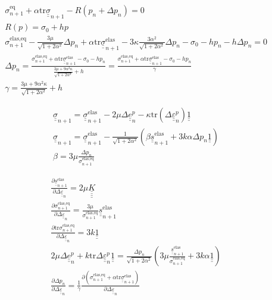 \documentclass[12pt]{article}
\newcommand\ul[1]{\underline{#1}}
\newcommand\uusigma{\ul{\ul{\sigma}}}
\newcommand\uus{\ul{\ul{s}}}
\newcommand\uue{\ul{\ul{e}}}
\newcommand\uuUnit{\ul{\ul{1}}}
\newcommand\uueps{\ul{\ul{\varepsilon}}}
\newcommand{\uuuuK}{\ul{\ul{\ul{\ul{K}}}}}
\newcommand\Deltaepsp{\Delta \uueps_{n}^p}
\newcommand\Deltaeps{\Delta \uueps_{n}}
\newcommand\Deltaep{\Delta \uue_{n}^p}
\newcommand\sigmaeqn{\sigma_{n+1}^\text{eq}}
\newcommand\sigmaeqnelas{\sigma_{n+1}^\text{elas,eq}}
\newcommand\uusn{\uus_{n+1}}
\newcommand\uusnelas{\uus_{n+1}^\text{elas}}
\newcommand\uusigman{\ul{\ul{\sigma}}_{n+1}}
\newcommand\uusigmanelas{\uusigman^{\text{elas}}}
\newcommand\mtr{\mathrm{tr}}
\begin{document}
\begin{align}
    & \sigmaeqn + \alpha \mtr \uusigman - R(p_n + \Delta p_n) = 0 \\
    & R(p) = \sigma_0 + h p \\
    & \sigmaeqnelas - \frac{3\mu}{\sqrt{1 + 2\alpha^2}}\Delta p_n + \alpha \mtr \uusigmanelas - 3\kappa \frac{3\alpha^2}{\sqrt{1 + 2\alpha^2}} \Delta p_n - \sigma_0 - h p_n - h \Delta p_n = 0 \\
    & \Delta p_n = \frac{ \sigmaeqnelas + \alpha \mtr \uusigmanelas - \sigma_0 - h p_n}{ \frac{3\mu + 9\alpha^2\kappa}{\sqrt{1 + 2\alpha^2}} + h} = \frac{ \sigmaeqnelas + \alpha \mtr \uusigmanelas - \sigma_0 - h p_n}{ \gamma } \\
    & \gamma = \frac{3\mu + 9\alpha^2\kappa}{\sqrt{1 + 2\alpha^2}} + h
\end{align}

\begin{align}
    & \uusigma_{n+1} = \uusigma_{n+1}^\text{elas} - 2\mu \Deltaep - \kappa \mtr (\Deltaepsp) \uuUnit \\
    & \uusigma_{n+1} = \uusigma_{n+1}^\text{elas} - \frac{1}{\sqrt{1 + 2\alpha^2}}\left( \beta \uusnelas + 3k\alpha \Delta p_n \uuUnit \right) \\
    & \beta = 3\mu\frac{\Delta p_n}{\sigmaeqnelas} 
\end{align}

\begin{align}
    & \frac{\partial \uusnelas{}}{\partial \Deltaeps} = 2\mu \uuuuK\\
    & \frac{\partial \sigmaeqnelas{}}{\partial \Deltaeps} = \frac{3\mu}{\sigmaeqnelas}\uusnelas \\
    & \frac{\partial\mtr\sigmaeqnelas}{\partial\Deltaeps} = 3k\uuUnit \\
    & 2\mu\Deltaep + k\mtr\Deltaepsp\uuUnit = \frac{\Delta p_n}{\sqrt{1 + 2\alpha^2}} \left( 3\mu \frac{\uusnelas}{\sigmaeqnelas} + 3k\alpha \uuUnit  \right) \\
    & \frac{\partial\Delta p_n}{\partial\Deltaeps} = \frac{1}{\gamma} \frac{\partial(\sigmaeqnelas + \alpha \mtr \uusigmanelas)}{\partial\Deltaeps}
\end{align}
\end{document}
